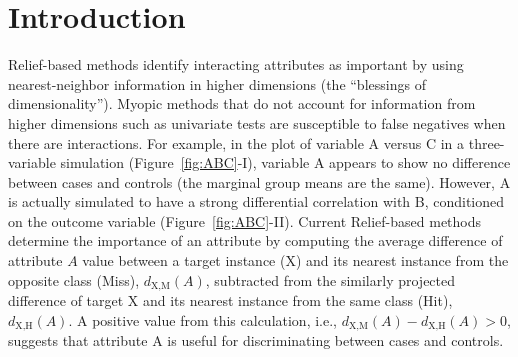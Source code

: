 \documentclass[10pt,letterpaper]{article}
\begin{document}
\linenumbers

\section*{Introduction}

Relief-based methods identify interacting attributes as important by using nearest-neighbor information in higher dimensions (the ``blessings of dimensionality''). Myopic methods that do not account for information from higher dimensions such as univariate tests are susceptible to false negatives when there are interactions. For example, in the plot of variable A versus C in a three-variable simulation (Figure~\ref{fig:ABC}-I), variable A appears to show no difference between cases and controls (the marginal group means are the same). However, A is actually simulated to have a strong differential correlation with B, conditioned on the outcome variable (Figure~\ref{fig:ABC}-II). Current Relief-based methods determine the importance of an attribute by computing the average difference of attribute $A$ value between a target instance (X) and its nearest instance from the opposite class (Miss), $d_{\text{X,M}}(A)$, subtracted from the similarly projected difference of target X and its nearest instance from the same class (Hit), $d_{\text{X,H}}(A)$. A positive value from this calculation, i.e., $d_{\text{X,M}}(A)-d_{\text{X,H}}(A) > 0$, suggests that attribute A is useful for discriminating between cases and controls.  
\end{document}
